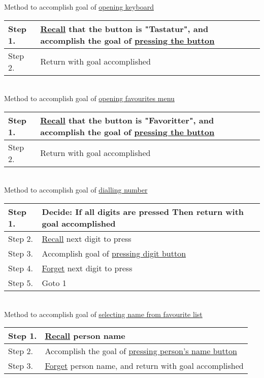 \documentclass{article}
\begin{document}
Method to accomplish goal of \uline{opening keyboard}

\begin{tabulary}{\textwidth}{| L | L |}
	\hline
	Step 1. & \uline{Recall} that the button is "Tastatur", and accomplish the goal of \uline{pressing the button} \\\hline
	Step 2. & Return with goal accomplished \\\hline
\end{tabulary}\\

Method to accomplish goal of \uline{opening favourites menu}

\begin{tabulary}{\textwidth}{| L | L |}
	\hline
	Step 1. & \uline{Recall} that the button is "Favoritter", and accomplish the goal of \uline{pressing the button} \\\hline
	Step 2. & Return with goal accomplished \\\hline
\end{tabulary}\\

Method to accomplish goal of \uline{dialling number}

\begin{tabulary}{\textwidth}{| L | L |}
	\hline
	Step 1. & Decide: If all digits are pressed Then return with goal accomplished \\\hline
	Step 2. & \uline{Recall} next digit to press \\\hline
	Step 3. & Accomplish goal of \uline{pressing digit button} \\\hline
	Step 4. & \uline{Forget} next digit to press \\\hline
	Step 5. & Goto 1 \\\hline
\end{tabulary}\\

Method to accomplish goal of \uline{selecting name from favourite list}

\begin{tabulary}{\textwidth}{| L | L |}
	\hline
	Step 1. & \uline{Recall} person name \\\hline
	Step 2. & Accomplish the goal of \uline{pressing person's name button} \\\hline
	Step 3. & \uline{Forget} person name, and return with goal accomplished \\\hline
\end{tabulary}\\
\end{document}
